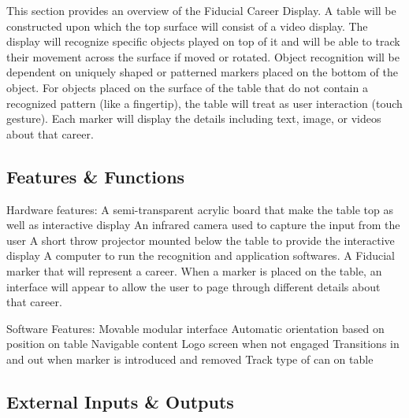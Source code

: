 This section provides an overview of the Fiducial Career Display. A table will be constructed upon which the top surface will consist of a video display. The display will recognize specific objects played on top of it and will be able to track their movement across the surface if moved or rotated. Object recognition will be dependent on uniquely shaped or patterned markers placed on the bottom of the object. For objects placed on the surface of the table that do not contain a recognized pattern (like a fingertip), the table will treat as user interaction (touch gesture). Each marker will display the details including text, image, or videos about that career.
\subsection{Features \& Functions}
Hardware features:\newline
A semi-transparent acrylic board that make the table top as well as interactive display\newline
An infrared camera used to capture the input from the user\newline
A short throw projector mounted below the table to provide the interactive display\newline
A computer to run the recognition and application softwares.\newline
A Fiducial marker that will represent a career. When a marker is placed on the table, an interface will appear to allow the user to page through different details about that career.

Software Features:\newline
Movable modular interface\newline
Automatic orientation based on position on table\newline
Navigable content\newline
Logo screen when not engaged\newline
Transitions in and out when marker is introduced and removed\newline
Track type of can on table\newline
\subsection{External Inputs \& Outputs}

